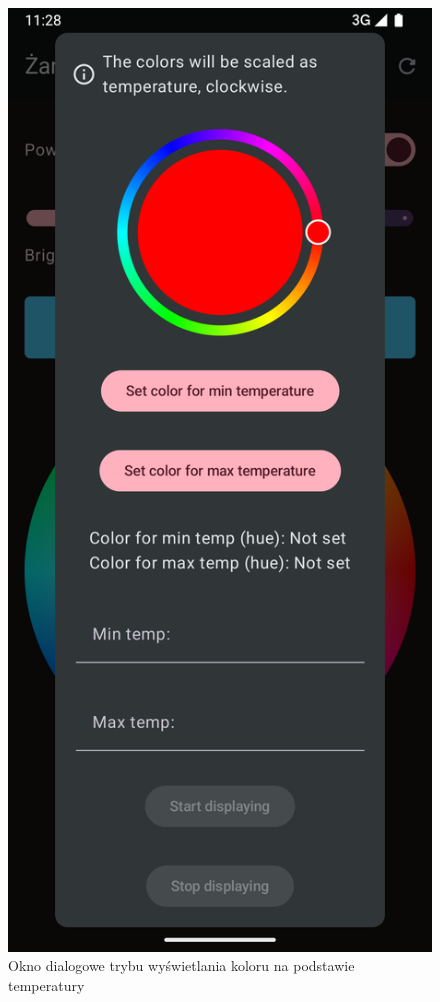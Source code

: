 \documentclass[12pt]{article}
\begin{document}
\begin{figure}[H]
    \centering
    \hypertarget{fig:temp-to-color-dialog}{}
    \includegraphics[scale=0.2]{figures/temp_to_color_screen1.png}
    \caption{Okno dialogowe trybu wyświetlania koloru na podstawie temperatury}
    \label{fig:temp-to-color-dialog}
\end{figure}
\end{document}
